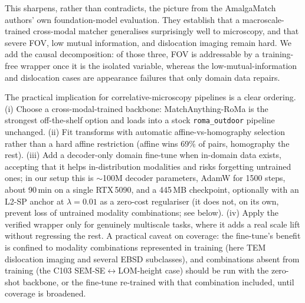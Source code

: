 \documentclass[fleqn,10pt]{wlscirep}
\begin{document}
This sharpens, rather than contradicts, the picture from the AmalgaMatch authors' own foundation-model evaluation\cite{durmaz2026foundation}. They establish that a macroscale-trained cross-modal matcher generalises surprisingly well to microscopy, and that severe FOV, low mutual information, and dislocation imaging remain hard. We add the causal decomposition: of those three, FOV is addressable by a training-free wrapper once it is the isolated variable, whereas the low-mutual-information and dislocation cases are appearance failures that only domain data repairs.

The practical implication for correlative-microscopy pipelines is a clear ordering. (i) Choose a cross-modal-trained backbone: MatchAnything-RoMa is the strongest off-the-shelf option and loads into a stock \texttt{roma\_outdoor} pipeline unchanged. (ii) Fit transforms with automatic affine-vs-homography selection rather than a hard affine restriction (affine wins 69\% of pairs, homography the rest). (iii) Add a decoder-only domain fine-tune when in-domain data exists, accepting that it helps in-distribution modalities and risks forgetting untrained ones; in our setup this is $\sim$100M decoder parameters, AdamW for 1500 steps, about 90\,min on a single RTX\,5090, and a 445\,MB checkpoint, optionally with an L2-SP anchor at $\lambda=0.01$ as a zero-cost regulariser (it does not, on its own, prevent loss of untrained modality combinations; see below). (iv) Apply the verified wrapper only for genuinely multiscale tasks, where it adds a real scale lift without regressing the rest. A practical caveat on coverage: the fine-tune's benefit is confined to modality combinations represented in training (here TEM dislocation imaging and several EBSD subclasses), and combinations absent from training (the C103 SEM-SE$\leftrightarrow$LOM-height case) should be run with the zero-shot backbone, or the fine-tune re-trained with that combination included, until coverage is broadened.
\end{document}
